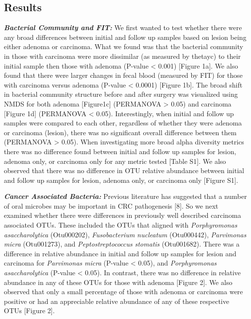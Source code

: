 \documentclass[12pt,]{article}
\begin{document}
\newpage

\subsection{Results}\label{results}

\textbf{\emph{Bacterial Community and FIT:}} We first wanted to test
whether there were any broad differences between initial and follow up
samples based on lesion being either adenoma or carcinoma. What we found
was that the bacterial community in those with carcinoma were more
dissimilar (as measured by thetayc) to their initial sample then those
with adenoma (P-value \textless{} 0.001) {[}Figure 1a{]}. We also found
that there were larger changes in fecal blood (measured by FIT) for
those with carcinoma versus adenoma (P-value \textless{} 0.0001)
{[}Figure 1b{]}. The broad shift in bacterial community structure before
and after surgery was visualized using NMDS for both adenoma
{[}Figure1c{]} (PERMANOVA \textgreater{} 0.05) and carcinoma {[}Figure
1d{]} (PERMANOVA \textless{} 0.05). Interestingly, when initial and
follow up samples were compared to each other, regardless of whether
they were adenoma or carcinoma (lesion), there was no significant
overall difference between them (PERMANOVA \textgreater{} 0.05). When
investigating more broad alpha diversity metrics there was no difference
found between initial and follow up samples for lesion, adenoma only, or
carcinoma only for any metric tested {[}Table S1{]}. We also observed
that there was no difference in OTU relative abundance between initial
and follow up samples for lesion, adenoma only, or carcinoma only
{[}Figure S1{]}.

\textbf{\emph{Cancer Associated Bacteria:}} Previous literature has
suggested that a number of oral microbes may be important in CRC
pathogenesis {[}8{]}. So we next examined whether there were differences
in previously well described carcinoma associated OTUs. These included
the OTUs that aligned with \emph{Porphyromonas asaccharolytica}
(Otu000202), \emph{Fusobacterium nucleatum} (Otu000442),
\emph{Parvimonas micra} (Otu001273), and \emph{Peptostreptococcus
stomatis} (Otu001682). There was a difference in relative abundance in
initial and follow up samples for lesion and carcinoma for
\emph{Parvimonas micra} (P-value \textless{} 0.05), and
\emph{Porphyromonas asaccharolytica} (P-value \textless{} 0.05). In
contrast, there was no difference in relative abundance in any of these
OTUs for those with adenoma {[}Figure 2{]}. We also observed that only a
small percentage of those with adenoma or carcinoma were positive or had
an appreciable relative abundance of any of these respective OTUs
{[}Figure 2{]}.
\end{document}
